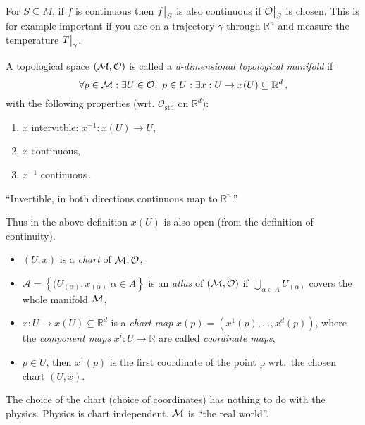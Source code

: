 \documentclass[11pt, a4paper, twocolumn]{article} %
\begin{document}
\begin{note}
    For $S \subseteq M$, if $f$ is continuous then $f\big|_{S}$ is also
    continuous if $\mathcal{O}\big|_S$ is chosen. This is for example important
    if you are on a trajectory $\gamma$ through $\mathbb{R}^n$ and measure the temperature
    $T\big|_\gamma$.
\end{note}

\begin{defn}
    A topological space $(\mathcal{M}, \mathcal{O})$ is called a \textit{d-dimensional topological manifold}
    if
    \begin{equation}
        \forall p \in \mathcal{M}: \exists U \in \mathcal{O},~p\in U: \exists x: U\to x(U)\subseteq \mathbb{R}^{d}
        \,,
    \end{equation}
    with the following properties (wrt. $\mathcal O_\text{std}$ on $\mathbb{R}^{d}$):
    \begin{enumerate}
        \item $x$ intervitble: $x^{-1} : x(U) \to U$,
        \item $x$ continuous,
        \item $x^{-1}$ continuous\,.
    \end{enumerate}
    ``Invertible, in both directions continuous map to $\mathbb{R}^{n}$.''
\end{defn}

\begin{note}
    Thus in the above definition $x(U)$ is also open (from the definition of continuity).
\end{note}

\begin{terminology}
    \begin{itemize}
        \item $(U,x)$ is a \textit{chart} of $\mathcal{M}, \mathcal{O}$,
        \item $\mathcal{A} = \left\{ (U_{(\alpha)}, x_{(\alpha)} | \alpha \in A \right\}$ is an \textit{atlas} of $(\mathcal{M}, \mathcal{O})$ if $\bigcup\limits_{\alpha\in A} U_{(\alpha)}$ covers the whole manifold $\mathcal{M}$,
        \item $x: U \to x(U) \subseteq \mathbb{R}^{d}$ is a \textit{chart map} 
            $x(p) = (x^1(p), \dots, x^d(p))$, where the \textit{component maps} $x^i: U\to\mathbb{R}$ are called \textit{coordinate maps},
        \item $p \in U$, then $x^1(p)$ is the first coordinate of the point p wrt.\ the chosen chart $(U, x)$.
    \end{itemize}
\end{terminology}
\begin{note}
    The choice of the chart (choice of coordinates) has nothing to do with the physics.
    Physics is chart independent. $\mathcal{M}$ is ``the real world''.
\end{note}
\end{document}

